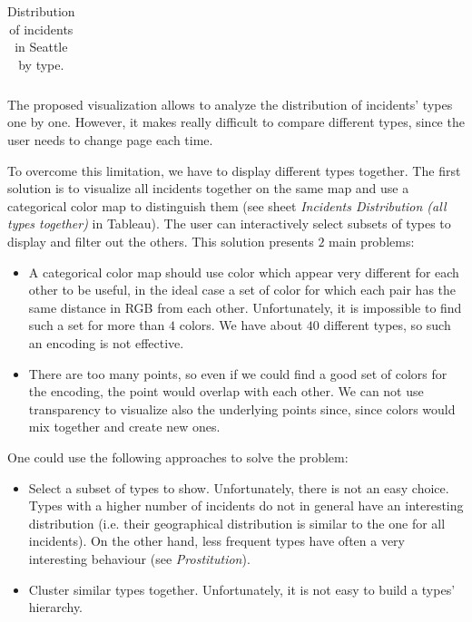 \begin{longtable}{ | >{\arraybackslash} m{5cm} | >{\arraybackslash} m{10cm} | }
    \caption{Distribution of incidents in Seattle by type.}
    \label{tab:distribution_by_type}
\end{longtable}

The proposed visualization allows to analyze the distribution of incidents' types one by one.
However, it makes really difficult to compare different types, since the user needs to change page each time.

To overcome this limitation, we have to display different types together.
The first solution is to visualize all incidents together on the same map and use a categorical color map to distinguish them (see sheet \textit{Incidents Distribution (all types together)} in Tableau).
The user can interactively select subsets of types to display and filter out the others.
This solution presents $2$ main problems:
\begin{itemize}
    \item A categorical color map should use color which appear very different for each other to be useful, in the ideal case a set of color for which each pair has the same distance in RGB from each other. Unfortunately, it is impossible to find such a set for more than $4$ colors. We have about $40$ different types, so such an encoding is not effective.
    \item There are too many points, so even if we could find a good set of colors for the encoding, the point would overlap with each other. We can not use transparency to visualize also the underlying points since, since colors would mix together and create new ones.
\end{itemize}

One could use the following approaches to solve the problem:
\begin{itemize}
    \item Select a subset of types to show. Unfortunately, there is not an easy choice. Types with a higher number of incidents do not in general have an interesting distribution (i.e. their geographical distribution is similar to the one for all incidents). On the other hand, less frequent types have often a very interesting behaviour (see \textit{Prostitution}).
    \item Cluster similar types together. Unfortunately, it is not easy to build a types' hierarchy.
\end{itemize}

